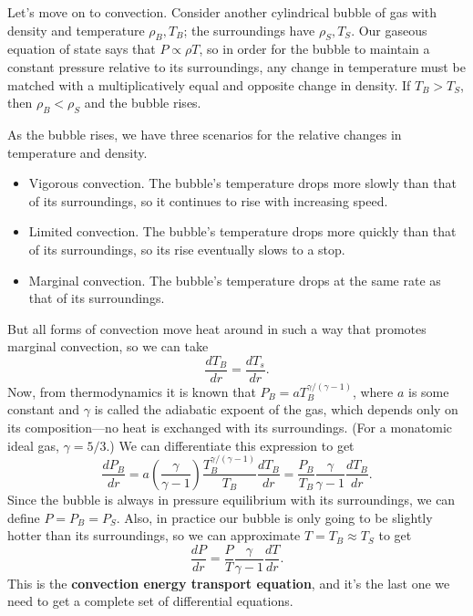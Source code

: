 \documentclass[../a062main.tex]{subfiles}
\begin{document}
Let's move on to convection. %
Consider another cylindrical bubble of gas with density and temperature $\rho_B, T_B$; the surroundings have $\rho_S, T_S$.
Our gaseous equation of state says that $P \propto \rho T$, so in order for the bubble to maintain a constant pressure relative to its surroundings, any change in temperature must be matched with a multiplicatively equal and opposite change in density.
If $T_B > T_S$, then $\rho_B < \rho_S$ and the bubble rises. %

As the bubble rises, we have three scenarios for the relative changes in temperature and density.
\begin{itemize}
    \item Vigorous convection.
    The bubble's temperature drops more slowly than that of its surroundings, so it continues to rise with increasing speed.

    \item Limited convection.
    The bubble's temperature drops more quickly than that of its surroundings, so its rise eventually slows to a stop.

    \item Marginal convection.
    The bubble's temperature drops at the same rate as that of its surroundings.
\end{itemize}
But all forms of convection move heat around in such a way that promotes marginal convection, so we can take
\[ \frac{dT_B}{dr} = \frac{dT_s}{dr}. \]
Now, from thermodynamics it is known that $P_B = a T_B^{\gamma / (\gamma - 1)}$, where $a$ is some constant and $\gamma$ is called the adiabatic expoent of the gas, which depends only on its composition---no heat is exchanged with its surroundings.
(For a monatomic ideal gas, $\gamma = 5 / 3$.)
We can differentiate this expression to get
\[ \frac{dP_B}{dr} = a \left( \frac{\gamma}{\gamma - 1} \right) \frac{T_B^{\gamma / (\gamma - 1)}}{T_B} \frac{dT_B}{dr} = \frac{P_B}{T_B} \frac{\gamma}{\gamma - 1} \frac{dT_B}{dr}. \]
Since the bubble is always in pressure equilibrium with its surroundings, we can define $P = P_B = P_S$.
Also, in practice our bubble is only going to be slightly hotter than its surroundings, so we can approximate $T = T_B \approx T_S$ to get
\[ \boxed{\frac{dP}{dr} = \frac{P}{T} \frac{\gamma}{\gamma - 1} \frac{dT}{dr}}. \]
This is the \textbf{convection energy transport equation}, and it's the last one we need to get a complete set of differential equations.
\end{document}
